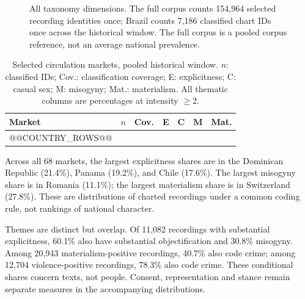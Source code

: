\documentclass[10pt,a4paper,twocolumn]{article}
\begin{document}
\begin{figure}[t]
\centering
{}
\caption{All taxonomy dimensions. The full corpus counts 154,964 selected recording identities once; Brazil counts 7,186 classified chart IDs once across the historical window. The full corpus is a pooled corpus reference, not an average national prevalence.}
\label{fig:themes}
\end{figure}

\begin{table}[t]
\caption{Selected circulation markets, pooled historical window. $n$: classified IDs; Cov.: classification coverage; E: explicitness; C: casual sex; M: misogyny; Mat.: materialism. All thematic columns are percentages at intensity $\geq2$.}
\label{tab:markets}
\centering\footnotesize\setlength{\tabcolsep}{3.5pt}
\begin{tabular}{@{}lrrrrrr@{}}
\toprule Market & $n$ & Cov. & E & C & M & Mat.\\
\midrule
@@COUNTRY_ROWS@@
\bottomrule
\end{tabular}
\end{table}

Across all 68 markets, the largest explicitness shares are in the Dominican Republic (21.4\%), Panama (19.2\%), and Chile (17.6\%). The largest misogyny share is in Romania (11.1\%); the largest materialism share is in Switzerland (27.8\%). These are distributions of charted recordings under a common coding rule, not rankings of national character.

Themes are distinct but overlap. Of 11,082 recordings with substantial explicitness, 60.1\% also have substantial objectification and 30.8\% misogyny. Among 20,943 materialism-positive recordings, 40.7\% also code crime; among 12,704 violence-positive recordings, 78.3\% also code crime. These conditional shares concern texts, not people. Consent, representation and stance remain separate measures in the accompanying distributions.
\end{document}
